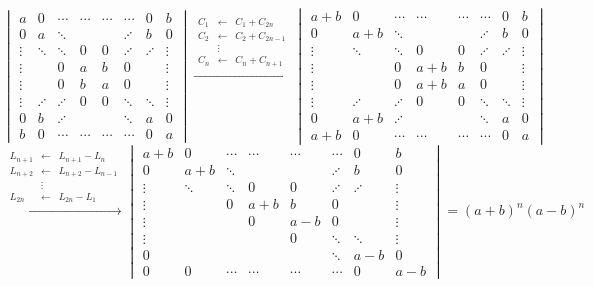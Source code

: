 \documentclass[a4paper, 10pt]{article}
\theoremstyle{plain}
\begin{document}
\[
\begin{vmatrix}
a & 0 & \cdots & \cdots & \cdots & \cdots &0 & b \\
0 & a & \ddots  &       &      &\iddots & b & 0 \\
\vdots & \ddots & \ddots & 0  & 0 &\iddots & \iddots  & \vdots \\
\vdots &  & 0 & a & b & 0 & &\vdots \\
\vdots & & 0 & b & a & 0 & & \vdots \\
\vdots & \iddots  & \iddots & 0 & 0 & \ddots & \ddots & \vdots \\
0 & b & \iddots & & & \ddots & a & 0 \\
b &0 & \cdots & \cdots & \cdots & \cdots & 0 & a
\end{vmatrix}
\xrightarrow{ 
\begin{matrix}
C_1 & \leftarrow &C_1 +C_{2n} \\
C_2 &\leftarrow & C_2 +C_{2n-1} \\
& \vdots & \\
C_{n} & \leftarrow &  C_n + C_{n+1}
\end{matrix}
}
\begin{vmatrix}
a+b & 0 & \cdots & \cdots & \cdots & \cdots &0 & b \\
0 & a+b & \ddots  &       &      &\iddots & b & 0 \\
\vdots & \ddots & \ddots & 0  & 0 &\iddots & \iddots  & \vdots \\
\vdots &  & 0 & a+b & b & 0 & &\vdots \\
\vdots & & 0 & a+b & a & 0 & & \vdots \\
\vdots & \iddots  & \iddots & 0 & 0 & \ddots & \ddots & \vdots \\
0 & a+b & \iddots & & & \ddots & a & 0 \\
a+b &0 & \cdots & \cdots & \cdots & \cdots & 0 & a
\end{vmatrix}
\]
\[
\xrightarrow{ 
\begin{matrix}
L_{n+1} & \leftarrow & L_{n+1} -L_n \\
L_{n+2} &\leftarrow & L_{n+2} - L_{n-1} \\
& \vdots & \\
L_{2n} & \leftarrow &  L_{2n} - L_1
\end{matrix}
}  
\begin{vmatrix}
a+b & 0 & \cdots & \cdots & \cdots & \cdots &0 & b \\
0 & a+b & \ddots  &       &      &\iddots & b & 0 \\
\vdots & \ddots & \ddots & 0  & 0 &\iddots & \iddots  & \vdots \\
\vdots &  & 0 & a+b & b & 0 & &\vdots \\
\vdots & &  & 0 & a-b & 0 & & \vdots \\
\vdots &   & &  & 0 & \ddots & \ddots & \vdots \\
0 &  &  & & & \ddots & a-b & 0 \\
0 &0 & \cdots & \cdots & \cdots & \cdots & 0 & a-b
\end{vmatrix} 
=(a+b)^n(a-b)^n
\]
\end{document}
